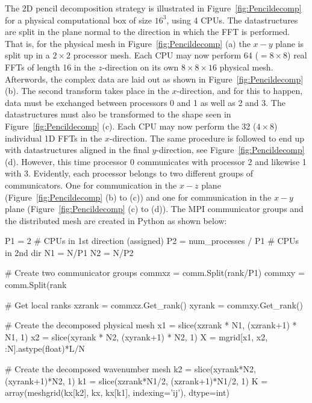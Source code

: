 \documentclass[final,1p,times]{elsarticle}
\begin{document}
The 2D pencil decomposition strategy is illustrated in Figure~\ref{fig:Pencildecomp} for a physical computational box of size $16^3$, using 4 CPUs. The datastructures are split in the plane normal to the direction in which the FFT is performed. That is, for the physical mesh in Figure~\ref{fig:Pencildecomp} (a) the $x-y$ plane is split up in a $2\times2$ processor mesh. Each CPU may now perform 64 ($= 8 \times 8$) real FFTs of length 16 in the $z$-direction on its own $8 \times 8 \times 16$ physical mesh. Afterwords, the complex data are laid out as shown in Figure~\ref{fig:Pencildecomp} (b). The second transform takes place in the $x$-direction, and for this to happen, data must be exchanged between processors 0 and 1 as well as 2 and 3. The datastructures must also be transformed to the shape seen in Figure~\ref{fig:Pencildecomp} (c). Each CPU may now perform the 32 ($4 \times 8$) individual 1D FFTs in the $x$-direction. The same procedure is followed to end up with datastructures aligned in the final $y$-direction, see Figure~\ref{fig:Pencildecomp} (d). However, this time processor 0 communicates with processor 2 and likewise 1 with 3. Evidently, each processor belongs to two different groups of communicators. One for communication in the $x-z$ plane (Figure~\ref{fig:Pencildecomp} (b) to (c)) and one for communication in the $x-y$ plane (Figure~\ref{fig:Pencildecomp} (c) to (d)). The MPI communicator groups and the distributed mesh are created in Python as shown below:

\noindent
\begin{minipage}[l]{\textwidth}
\begin{python}
P1 = 2  # CPUs in 1st direction (assigned)
P2 = num_processes / P1 # CPUs in 2nd dir
N1 = N/P1
N2 = N/P2

# Create two communicator groups
commxz = comm.Split(rank/P1)
commxy = comm.Split(rank%

# Get local ranks
xzrank = commxz.Get_rank()
xyrank = commxy.Get_rank()

# Create the decomposed physical mesh
x1 = slice(xzrank * N1, (xzrank+1) * N1, 1)
x2 = slice(xyrank * N2, (xyrank+1) * N2, 1)
X = mgrid[x1, x2, :N].astype(float)*L/N

# Create the decomposed wavenumber mesh
k2 = slice(xyrank*N2, (xyrank+1)*N2, 1)
k1 = slice(xzrank*N1/2, (xzrank+1)*N1/2, 1)
K = array(meshgrid(kx[k2], kx, kx[k1], indexing='ij'), dtype=int)
\end{python}
\end{minipage}
\end{document}
